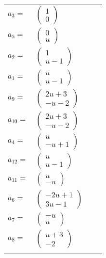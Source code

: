 \documentclass[1p]{elsarticle_modified}
\theoremstyle{definition}
\begin{document}
\begin{tabular}{m{7pt} m{180pt} m{7pt} m{180pt} }
\flushright $a_{3}=$&$\begin{pmatrix}1\\0\end{pmatrix}$ \\
\flushright $a_{5}=$&$\begin{pmatrix}0\\u\end{pmatrix}$ \\
\flushright $a_{2}=$&$\begin{pmatrix}1\\u-1\end{pmatrix}$ \\
\flushright $a_{1}=$&$\begin{pmatrix}u\\u-1\end{pmatrix}$ \\
\flushright $a_{9}=$&$\begin{pmatrix}2 u+3\\- u-2\end{pmatrix}$ \\
\flushright $a_{10}=$&$\begin{pmatrix}2 u+3\\- u-2\end{pmatrix}$ \\
\flushright $a_{4}=$&$\begin{pmatrix}u\\- u+1\end{pmatrix}$ \\
\flushright $a_{12}=$&$\begin{pmatrix}u\\u-1\end{pmatrix}$ \\
\flushright $a_{11}=$&$\begin{pmatrix}u\\- u\end{pmatrix}$ \\
\flushright $a_{6}=$&$\begin{pmatrix}-2 u+1\\3 u-1\end{pmatrix}$ \\
\flushright $a_{7}=$&$\begin{pmatrix}- u\\u\end{pmatrix}$ \\
\flushright $a_{8}=$&$\begin{pmatrix}u+3\\-2\end{pmatrix}$\\&\end{tabular}
\end{document}
